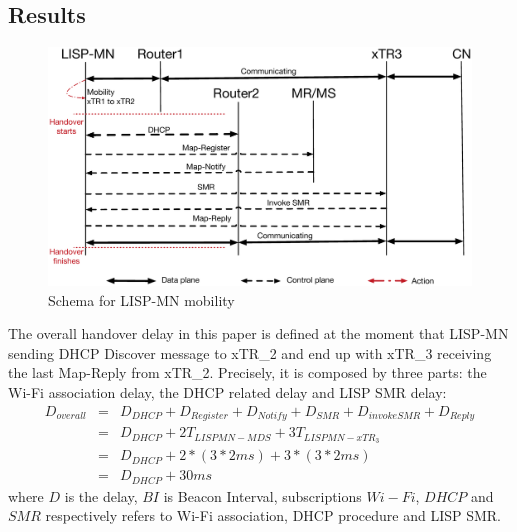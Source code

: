 \subsection{Results}
\label{sec:ns3_results_lispmn}

\begin{figure}[!th]
	\centering
	\includegraphics[width=\textwidth]{Pics/Mobility_LISPMN_schema_SMR_simplify}
	\caption{Schema for LISP-MN mobility}
	\label{sim_schema}
\end{figure}

The overall handover delay in this paper is defined at the moment that LISP-MN sending DHCP Discover message to xTR\_2 and end up with xTR\_3 receiving the last Map-Reply from xTR\_2. Precisely, it is composed by three parts: the Wi-Fi association delay, the DHCP related delay and LISP SMR delay:
\begin{eqnarray}
	D_{overall} &=& D_{DHCP} + D_{Register} + D_{Notify} + D_{SMR} + D_{invokeSMR} + D_{Reply} \nonumber \\
	&=& D_{DHCP} + 2T_{LISPMN-MDS} + 3T_{LISPMN-xTR_3} \nonumber \\
	&=& D_{DHCP} + 2* (3*2ms) + 3*(3*2ms)\nonumber \\
	&=& D_{DHCP} + 30 ms
\end{eqnarray}
where $D$ is the delay, $BI$ is Beacon Interval, subscriptions $Wi-Fi$, $DHCP$ and $SMR$ respectively refers to Wi-Fi association, DHCP procedure and LISP SMR. 

